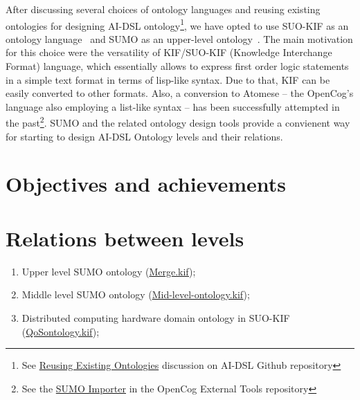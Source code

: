 \documentclass[]{report}
\newcommand{\kabir}[2][]{\todo[color=yellow,author=kabir, #1]{#2}}
\begin{document}
After discussing several choices of ontology languages and reusing existing
ontologies for designing AI-DSL ontology\footnote{See
\href{https://github.com/singnet/ai-dsl/discussions/18}{Reusing Existing
Ontologies} discussion on AI-DSL Github repository\cite{AIDSLRepo}}, we have opted to
use SUO-KIF as an ontology language~\cite{pease_standard_2009} and SUMO as an
upper-level ontology~\cite{NilesPease2001}. The main motivation for this choice
were the versatility of KIF/SUO-KIF (Knowledge Interchange Format) language,
which essentially allows to express first order logic statements in a simple
text format in terms of lisp-like syntax. Due to that, KIF can be easily
converted to other formats\cite{kalibatiene_survey_2011}. Also, a conversion to
Atomese -- the OpenCog's language also employing a list-like syntax -- has been
successfully attempted in the past\footnote{See
the \href{https://github.com/opencog/external-tools/tree/master/SUMO_importer}{SUMO
  Importer} in the OpenCog External Tools
repository\cite{ExternalToolsRepo}}. SUMO and the related ontology design tools
\cite{pease_sigma_2001} provide a convienent way for starting to design AI-DSL
Ontology levels and their relations.

\kabir[inline]{Finished here: 2021-05-27T01:37 CET}

\section{Objectives and achievements}

\section{Relations between levels}

\begin{enumerate}
  \item Upper level SUMO ontology
  (\href{https://github.com/ontologyportal/sumo/blob/master/Merge.kif}{Merge.kif});
  \item Middle level SUMO ontology
(\href{https://github.com/ontologyportal/sumo/blob/master/Mid-level-ontology.kif}{Mid-level-ontology.kif});
  \item Distributed computing hardware domain ontology in SUO-KIF
(\href{https://github.com/ontologyportal/sumo/blob/master/QoSontology.kif}{QoSontology.kif});
\end{enumerate}
\end{document}
